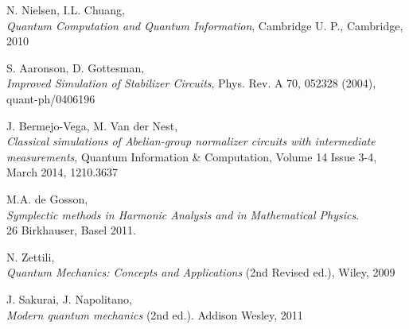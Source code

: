 \documentclass[11pt,a4paper,twoside,pdf]{article}
\numberwithin{equation}{section}
\begin{document}
\begin{thebibliography}{100}
	
		N. Nielsen, I.L. Chuang, \\
		{\em Quantum Computation and Quantum Information}, Cambridge U. P., Cambridge, 2010

		S. Aaronson, D. Gottesman, \\
		{\em Improved Simulation of Stabilizer Circuits}, Phys. Rev. A 70, 052328 (2004), \\
		quant-ph/0406196
		
		J. Bermejo-Vega, M. Van der Nest, \\
		{\em Classical simulations of Abelian-group normalizer circuits with intermediate \\ measurements}, Quantum Information \& Computation, Volume 14 Issue 3-4, \\
		March 2014, 1210.3637		

		M.A. de Gosson, \\
		{\em Symplectic methods in Harmonic Analysis and in Mathematical Physics}. \\
		26 Birkhauser, Basel 2011.

		N. Zettili, \\
		{\em Quantum Mechanics: Concepts and Applications} (2nd Revised ed.), Wiley, 2009
		
		J. Sakurai, J. Napolitano, \\
		{\em Modern quantum mechanics} (2nd ed.). Addison Wesley, 2011
	
		

		

 
\end{thebibliography}
\end{document}
